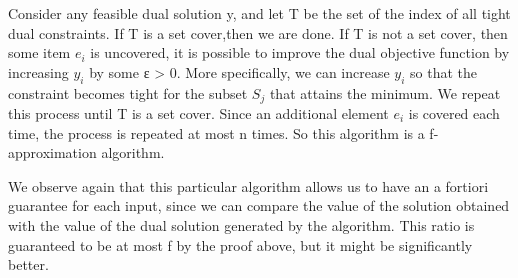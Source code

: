 \documentclass[usletter]{article}
\begin{document}
Consider any feasible dual solution y, and let T be the set of the index of all tight dual constraints. If T is a set cover,then we are done. If T is not a set cover, then some item $e_i$ is uncovered, it is possible to improve the dual objective function by increasing $y_i$ by some ε > 0. More specifically, we can increase $y_i$ so that the constraint becomes tight for the subset $S_j$ that attains the minimum.  We repeat this process until T is a set cover. Since an additional element $e_i$ is covered each time, the process is repeated at most n times. So this algorithm is a f-approximation algorithm.

We observe again that this particular algorithm allows us to have an a fortiori guarantee for each input, since we can compare the value of the solution obtained with the value of the dual solution generated by the algorithm. This ratio is guaranteed to be at most f by the proof above, but it might be significantly better.



\end{document}
